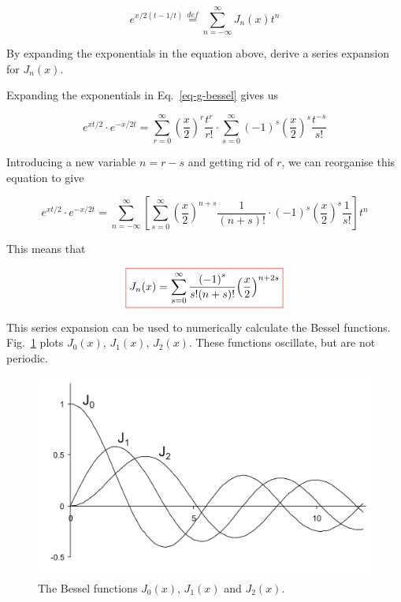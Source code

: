 \begin{equation}
e^{x/2(t-1/t)}  \stackrel{def}{=} \sum_{n = - \infty}^{\infty} J_n(x)t^n \label{eq-g-bessel}
\end{equation}

\begin{cue}
By expanding the exponentials in the equation above, derive a series expansion for  $J_n(x)$.  
\end{cue}

Expanding the exponentials in Eq.~\ref{eq-g-bessel} gives us

\begin{equation}
e^{xt/2} \cdot e^{-x/2t} = \sum_{r = 0}^{\infty} {\left(\frac{x}{2}\right)}^r \frac{t^r}{r!} \cdot \sum_{s = 0}^{\infty} {(-1)}^s { \left(\frac{x}{2}\right)}^s \frac{t^{-s}}{s!}
\end{equation} 

Introducing a new variable $n = r - s$ and getting rid of $r$, we can reorganise this equation to give

\begin{equation}
e^{xt/2} \cdot e^{-x/2t} = \sum_{n = -\infty}^{\infty} \left[ \sum_{s = 0}^{\infty} {\left(\frac{x}{2}\right)}^{n+s} \frac{1}{(n+s)!} \cdot (-1)^s {\left(\frac{x}{2}\right)}^{s} \frac{1}{s!} \right] t^n
\end{equation} 

This means that

\begin{equation}
\fbox{$\displaystyle
J_n(x) = \sum_{s = 0}^{\infty} \frac {{(-1)}^s}{s!(n+s)!} {\left(\frac{x}{2}\right)}^{n+2s} \label{eq-bessel-series}
$}
\end{equation} 

This series expansion can be used to numerically calculate the Bessel functions. Fig.~\ref{fig-bessel-J} plots $J_0(x)$, $J_1(x)$, $J_2(x)$. These functions oscillate, but are not periodic.

\begin{figure}
\centering
\includegraphics[scale=0.7]{special/figures/j}
\caption{The Bessel functions $J_0(x)$, $J_1(x)$ and $J_2(x)$.}
\label{fig-bessel-J}
\end{figure}

